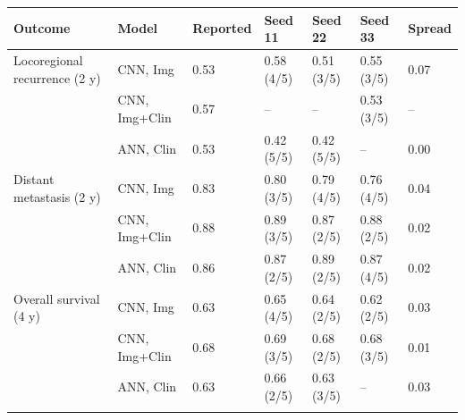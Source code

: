 \begin{tabular}{@{}lllllll@{}}
\toprule
Outcome & Model & Reported & Seed 11 & Seed 22 & Seed 33 & Spread \\
\midrule
Locoregional recurrence (2 y) & CNN, Img & 0.53 & 0.58 (4/5) & 0.51 (3/5) & 0.55 (3/5) & 0.07 \\
 & CNN, Img+Clin & 0.57 & -- & -- & 0.53 (3/5) & -- \\
 & ANN, Clin & 0.53 & 0.42 (5/5) & 0.42 (5/5) & -- & 0.00 \\
\midrule
Distant metastasis (2 y) & CNN, Img & 0.83 & 0.80 (3/5) & 0.79 (4/5) & 0.76 (4/5) & 0.04 \\
 & CNN, Img+Clin & 0.88 & 0.89 (3/5) & 0.87 (2/5) & 0.88 (2/5) & 0.02 \\
 & ANN, Clin & 0.86 & 0.87 (2/5) & 0.89 (2/5) & 0.87 (4/5) & 0.02 \\
\midrule
Overall survival (4 y) & CNN, Img & 0.63 & 0.65 (4/5) & 0.64 (2/5) & 0.62 (2/5) & 0.03 \\
 & CNN, Img+Clin & 0.68 & 0.69 (3/5) & 0.68 (2/5) & 0.68 (3/5) & 0.01 \\
 & ANN, Clin & 0.63 & 0.66 (2/5) & 0.63 (3/5) & -- & 0.03 \\
\botrule
\end{tabular}
